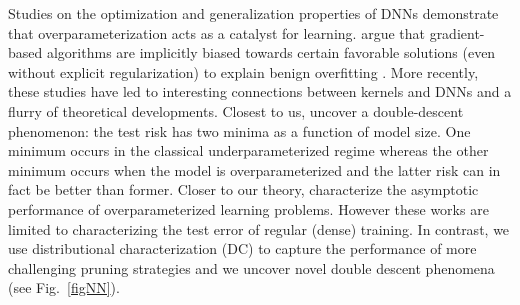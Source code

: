  Studies on the optimization and generalization properties of DNNs demonstrate that overparameterization acts as a catalyst for learning. \cite{arora2018optimization,neyshabur2014search,gunasekar2017implicit,ji2018risk} argue that gradient-based algorithms are implicitly biased towards certain favorable solutions (even without  explicit regularization) to explain benign overfitting \cite{bartlett2020benign,oymak2020towards,du2019gradient,chizat2019lazy,belkin2018understand,belkin2019does,tsigler2020benign,liang2018just,mei2019generalization,ju2020overfitting}. More recently, these studies have led to interesting connections between kernels and DNNs and a flurry of theoretical developments. Closest to us, \cite{nakkiran2019deep,belkin2019two,belkin2019reconciling} uncover a double-descent phenomenon: the test risk has two minima as a function of model size. One minimum occurs in the classical underparameterized regime whereas the other minimum occurs when the model is overparameterized and the latter risk can in fact be better than former. Closer to our theory, \cite{derezinski2019exact,hastie2019surprises,montanari2019generalization,deng2019model,kini2020analytic,liang2020precise,salehi2020performance,ju2020overfitting} characterize the asymptotic performance of overparameterized learning problems. However these works are limited to characterizing the test error of regular (dense) training. In contrast, we use distributional characterization (DC) to capture the performance of more challenging pruning strategies and we uncover novel double descent phenomena (see Fig.~\ref{figNN}).






